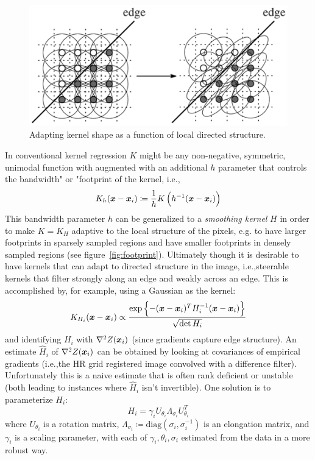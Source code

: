 \begin{figure}
    \centering
    \includegraphics[width=\linewidth,keepaspectratio]{figures/classical/steering.png}
    \caption{Adapting kernel shape as a function of local directed structure\cite{Takeda2007}.}
    \label{fig:steering}
\end{figure}
In conventional kernel regression \(K\) might be any non-negative, symmetric, unimodal\cite{wand1994kernel} function with augmented with an additional \(h\) parameter that controls the bandwidth" or "footprint of the kernel, i.e.,\begin{equation}
    K_h(\bm{x} - \bm{x}_i) \coloneqq \frac{1}{h}K\left( h^{-1}(\bm{x} - \bm{x}_i) \right)
\end{equation}
This bandwidth parameter \(h\) can be generalized to a \textit{smoothing kernel} \(H\) in order to make \(K = K_H\) adaptive to the local structure of the pixels, e.g. to have larger footprints in sparsely sampled regions and have smaller footprints in densely sampled regions (see figure~\ref{fig:footprint}).
%
Ultimately though it is desirable to have kernels that can adapt to directed structure in the image, i.e.,steerable kernels that filter strongly along an edge and weakly across an edge.
%
This is accomplished by, for example, using a Gaussian as the kernel:
\begin{equation}
    K_{H_i}(\bm{x} - \bm{x}_i) \propto \frac{\exp\left\{ -(\bm{x} - \bm{x}_i)^T H^{-1}_i (\bm{x} - \bm{x}_i) \right\}}{\sqrt{\det{H_i}}}
\end{equation}
and identifying \(H_i\) with \(\nabla^2 Z(\bm{x}_i)\) (since gradients capture edge structure).
%
An estimate \(\hat{H}_i\) of \(\nabla^2 Z(\bm{x}_i)\) can be obtained by looking at covariances of empirical gradients (i.e.,the HR grid registered image convolved with a difference filter).
%
Unfortunately this is a naive estimate that is often rank deficient or unstable (both leading to instances where \(\hat{H}_i\) isn't invertible).
%
One solution is to parameterize \(H_i\):
\[
    H_i = \gamma_i U_{\theta_i} \Lambda_{\sigma_i} U_{\theta_i}^T
\]
where \(U_{\theta_i}\) is a rotation matrix, \(\Lambda_{\sigma_i} \coloneqq \text{diag}\left( \sigma_i, \sigma_i^{-1} \right)\) is an elongation matrix, and \(\gamma_i\) is a scaling parameter, with each of \(\gamma_i, \theta_i, \sigma_i\) estimated from the data in a more robust way.
%
